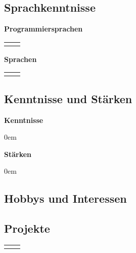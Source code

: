 ﻿\documentclass[
	a4paper,
	fontsize=12
]{scrartcl}
\begin{document}
\subsection{Sprachkenntnisse}
\begin{minipage}[t]{0.5\textwidth}
	\textbf{Programmiersprachen\medskip}\\
	\begin{tabularx}{\textwidth}{l!{\color{RoyalBlue}\vrule}X}
		\CVProgLangs
	\end{tabularx}
\end{minipage}
\begin{minipage}[t]{0.5\textwidth}
	\textbf{Sprachen\medskip}\\
	\begin{tabularx}{\textwidth}{l!{\color{RoyalBlue}\vrule}X}
		\CVNatLangs
	\end{tabularx}
\end{minipage}

\subsection{Kenntnisse und Stärken}
\begin{minipage}[t]{0.5\textwidth}
	\textbf{Kenntnisse}
	\begin{flushleft}
	\begin{itemize}\itemsep0em
		\CVKnowledge
	\end{itemize}
	\end{flushleft}
\end{minipage}
\BlueVLine{ }
\begin{minipage}[t]{0.5\textwidth}
	\textbf{Stärken}
	\begin{flushleft}
	\begin{itemize}\itemsep0em
		\CVStrength
	\end{itemize}
	\end{flushleft}
\end{minipage}

\subsection{Hobbys und Interessen}
	\CVHobbiesInterests
\newpage

\filbreak
\subsection{Projekte}
\begin{flushleft}
	\setlength{\extrarowheight}{.5em}
	\begin{tabularx}{\textwidth}{l!{\color{RoyalBlue}\vrule}X}
		\CVProjects
	\end{tabularx}
\end{flushleft}
\end{document}
